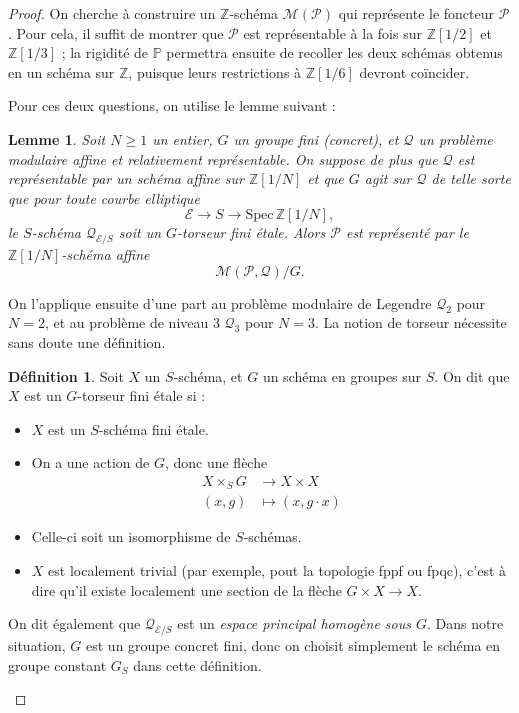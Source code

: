 \documentclass[11pt,a4paper]{article}
\newcommand{\Z}{\mathbb{Z}}
\newcommand{\E}{\mathcal{E}}
\renewcommand{\Pr}{\mathcal{P}}
\newcommand{\Qr}{\mathcal{Q}}
\renewcommand{\P}{\mathbb{P}}
\newcommand{\M}{\mathcal{M}}
\newcommand{\vers}{\longrightarrow}
\newcommand{\Spec}{\mathrm{Spec}\,}
\newtheorem*{lem}{Lemme}
\theoremstyle{definition}
\newtheorem*{defi}{Définition}
\begin{document}
\begin{proof}
On cherche à construire un $\Z$-schéma $\M(\Pr)$ qui représente le foncteur $\Pr$. Pour cela, il suffit de montrer que $\Pr$ est représentable à la fois sur $\Z[1/2]$ et $\Z[1/3]$ ; la rigidité de $\P$ permettra ensuite de recoller les deux schémas obtenus en un schéma sur $\Z$, puisque leurs restrictions à $\Z[1/6]$ devront coïncider.

Pour ces deux questions, on utilise le lemme suivant :

\begin{lem}
Soit $N\geq 1$ un entier, $G$ un groupe fini (concret), et $\Qr$ un problème modulaire affine et relativement représentable. On suppose de plus que $\Qr$ est représentable par un schéma affine sur $\Z[1/N]$ et que $G$ agit sur $\Qr$ de telle sorte que pour toute courbe elliptique
$$\E\vers S\vers \Spec \Z[1/N],$$
le $S$-schéma $\Qr_{\E/S}$ soit un $G$-torseur fini étale. Alors $\Pr$ est représenté par le $\Z[1/N]$-schéma affine
$$\M(\Pr,\Qr)/G.$$
\end{lem}

On l'applique ensuite d'une part au problème modulaire de Legendre $\Qr_2$ pour $N = 2$, et au problème de niveau 3 $\Qr_3$ pour $N = 3$. La notion de torseur nécessite sans doute une définition.

\begin{defi}
Soit $X$ un $S$-schéma, et $G$ un schéma en groupes sur $S$. On dit que $X$ est un $G$-torseur fini étale si :
\begin{itemize}
\item $X$ est un $S$-schéma fini étale.
\item On a une action de $G$, donc une flèche
$$\begin{aligned}
X \times_S G &\vers X \times X \\
(x, g) &\longmapsto (x, g\cdot x)
\end{aligned}$$
\item Celle-ci soit un isomorphisme de $S$-schémas.
\item $X$ est localement trivial (par exemple, pout la topologie fppf ou fpqc), c'est à dire qu'il existe localement une section de la flèche $G\times X\vers X$.
\end{itemize}
On dit également que $\Qr_{\E/S}$ est un \emph{espace principal homogène sous $G$}. Dans notre situation, $G$ est un groupe concret fini, donc on choisit simplement le schéma en groupe constant $G_S$ dans cette définition.
\end{defi}


\end{proof}
\end{document}
